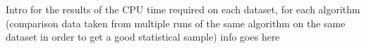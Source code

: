 \documentclass[../../ClusteringConnectionsMAIN.tex]{subfiles}
\begin{document}
\begin{flushleft}
\begin{large}

Intro for the results of the CPU time required on each dataset, for each algorithm (comparison data taken from multiple runs of the same algorithm on the same dataset in order to get a good statistical sample) info goes here


\end{large}
\end{flushleft}
\end{document}
